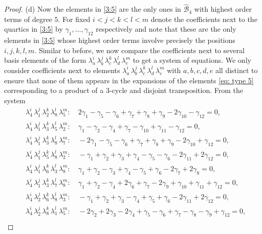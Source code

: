 \documentclass[12pt,dvipsnames,accepted=2016-08-18,a4paper,onecolumn]{quantumarticle}
\numberwithin{equation}{section}
\newcommand{\cB}{\mathcal B}
\theoremstyle{definition}
\begin{document}
\begin{proof}
(d) Now the elements in \eqref{3:5} are the only ones in $\hat{\cB}_4$ with highest order terms of degree $5.$ For fixed $i<j<k<l<m$ denote the coefficients next to the quartics in \eqref{3:5} by $\gamma_1,\ldots,\gamma_{12}$ respectively and note that these are the only elements in \eqref{3:5} whose highest order terms involve precisely the positions $i,j,k,l,m.$ Similar to before, we now compare the coefficients next to several basis elements 
of the form $\lambda_a^i\, \lambda_b^j\, \lambda_c^k\, \lambda_d^l\, \lambda_e^m$ to get a system of equations. We only consider coefficients next to elements $\lambda_a^i\, \lambda_b^j\, \lambda_c^k\, \lambda_d^l\, \lambda_e^m$ with $a,b,c,d,e$ all distinct to ensure that none of them appears in the expansions of the elements \eqref{eq: type 5} corresponding to a product of a $3$-cycle and  disjoint transposition. From the system
\begin{align*}
     &\lambda_4^i\, \lambda_1^j\, \lambda_2^k\, \lambda_8^l\, \lambda_5^m: \quad 2 \gamma_1 - \gamma_5 - \gamma_6 + \gamma_7 + \gamma_8 + \gamma_9 - 2 \gamma_{10} - \gamma_{12} = 0,\\
&\lambda_4^i\, \lambda_1^j\, \lambda_3^k\, \lambda_5^l\, \lambda_2^m: \quad \gamma_1 - \gamma_2 - \gamma_4 + \gamma_7 - \gamma_{10} + \gamma_{11} - \gamma_{12} = 0,\\
&\lambda_4^i\, \lambda_1^j\, \lambda_3^k\, \lambda_8^l\, \lambda_7^m: \quad-2 \gamma_1 - \gamma_5 - \gamma_6 + \gamma_7 + \gamma_8 + \gamma_9 - 2 \gamma_{10} + \gamma_{12} = 0, \\
&\lambda_4^i\, \lambda_1^j\, \lambda_5^k\, \lambda_8^l\, \lambda_2^m: \quad-\gamma_1 + \gamma_2 + \gamma_3 + \gamma_4 - \gamma_5 - \gamma_6 - 2 \gamma_{11} + 2 \gamma_{12} = 0,\\
&\lambda_4^i\, \lambda_1^j\, \lambda_6^k\, \lambda_3^l\, \lambda_8^m: \quad\gamma_1 + \gamma_2 - \gamma_3 + \gamma_4 - \gamma_5 + \gamma_6 - 2 \gamma_7 + 2 \gamma_8 = 0,\\
&\lambda_4^i\, \lambda_1^j\, \lambda_3^k\, \lambda_7^l\, \lambda_8^m: \quad\gamma_1 + \gamma_2 - \gamma_4 + 2 \gamma_6 + \gamma_7 - 2 \gamma_9 + \gamma_{10} + \gamma_{11} + \gamma_{12} = 0,\\
&\lambda_4^i\, \lambda_2^j\, \lambda_6^k\, \lambda_8^l\, \lambda_3^m: \quad-\gamma_1 + \gamma_2 + \gamma_3 - \gamma_4 + \gamma_5 + \gamma_6 - 2 \gamma_{11} + 2 \gamma_{12} = 0,\\
&\lambda_4^i\, \lambda_2^j\, \lambda_8^k\, \lambda_1^l\, \lambda_5^m: \quad-2 \gamma_2 + 2 \gamma_3 - 2 \gamma_4 + \gamma_5 - \gamma_6 + \gamma_7 - \gamma_8 - \gamma_9 + \gamma_{12} = 0,\\

\end{align*}
\end{proof}
\end{document}
